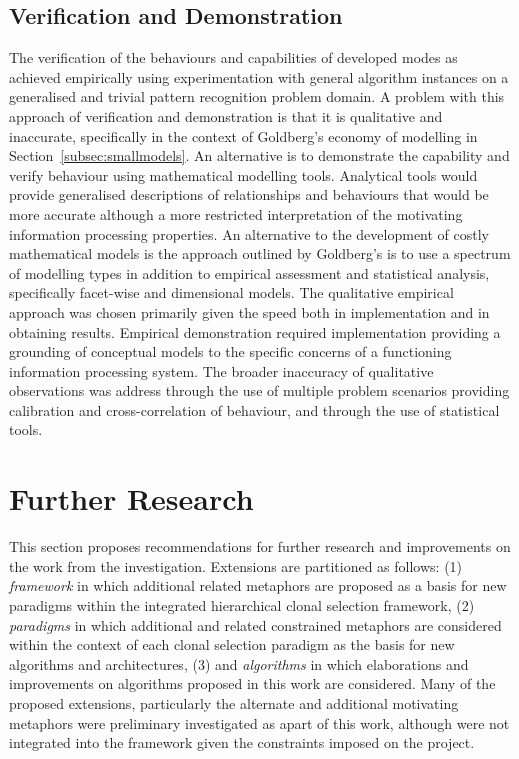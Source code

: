 \subsection{Verification and Demonstration}
The verification of the behaviours and capabilities of developed modes as achieved empirically using experimentation with general algorithm instances on a generalised and trivial pattern recognition problem domain. A problem with this approach of verification and demonstration is that it is qualitative and inaccurate, specifically in the context of Goldberg's economy of modelling in Section~\ref{subsec:smallmodels}.
An alternative is to demonstrate the capability and verify behaviour using mathematical modelling tools. 
Analytical tools would provide generalised descriptions of relationships and behaviours that would be more accurate although a more restricted interpretation of the motivating information processing properties. 
An alternative to the development of costly mathematical models is the approach outlined by Goldberg's is to use a spectrum of modelling types in addition to empirical assessment and statistical analysis, specifically facet-wise and dimensional models. 
The qualitative empirical approach was chosen primarily given the speed both in implementation and in obtaining results. Empirical  demonstration required implementation providing a grounding of conceptual models to the specific concerns of a functioning information processing system. The broader inaccuracy of qualitative observations was address through the use of multiple problem scenarios providing calibration and cross-correlation of behaviour, and through the use of statistical tools.


%
%
\section{Further Research}
\label{sec:conclusions:extensions}
This section proposes recommendations for further research and improvements on the work from the investigation.  
Extensions are partitioned as follows: (1) \emph{framework} in which additional related metaphors are proposed as a basis for new paradigms within the integrated hierarchical clonal selection framework, (2) \emph{paradigms} in which additional and related constrained metaphors are considered within the context of each clonal selection paradigm as the basis for new algorithms and architectures, (3) and \emph{algorithms} in which elaborations and improvements on algorithms proposed in this work are considered. 
Many of the proposed extensions, particularly the alternate and additional motivating metaphors were preliminary investigated as apart of this work, although were not integrated into the framework given the constraints imposed on the project.

